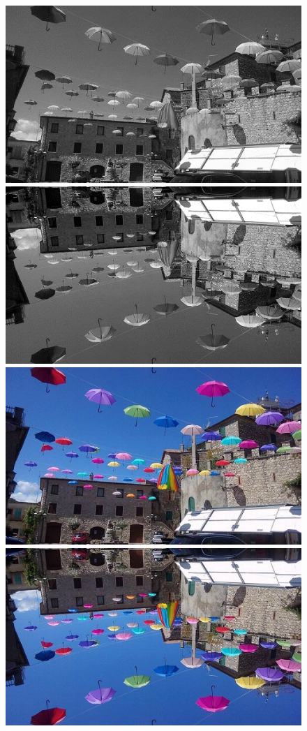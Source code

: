 \documentclass{article}
\begin{document}
	\begin{figure}[!ht]	
	\centering	
	\includegraphics{img/gray-obraz1}	
	\includegraphics{img/geometryczne/symetriaX-gray}
	\includegraphics{img/rgb-obraz1}	
	\includegraphics{img/geometryczne/symetriaX-rgb}

\end{figure}
\end{document}

